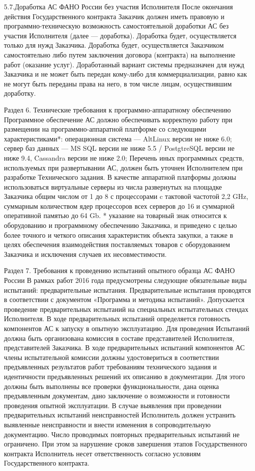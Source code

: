 5.7.Доработка АС  ФАНО России без участия Исполнителя
После окончания действия Государственного контракта Заказчик должен иметь правовую и программно-техническую возможность самостоятельной доработки АС  без участия Исполнителя (далее — доработка).
Доработка будет, осуществляется только для нужд Заказчика.
Доработка будет, осуществляется Заказчиком самостоятельно либо путем заключения договора (контракта) на выполнение работ (оказание услуг).
Доработанный вариант системы предназначен для нужд Заказчика и не может быть передан кому-либо для коммерциализации, равно как не могут быть переданы права на него, в том числе лицам, осуществившим доработку.

Раздел 6. Технические требования к программно-аппаратному обеспечению  
Программное обеспечение АС  должно обеспечивать корректную работу при размещении на программно-аппаратной платформе со следующими характеристиками*: 
операционная система — AltLinux версии не ниже 6.0; 
сервер баз данных — MS SQL версии не ниже 5.5 / PostgtreSQL версии не ниже 9.4, Cassandra версии не ниже 2.0;
Перечень иных программных средств, используемых при развертывании АС, должен быть уточнен Исполнителем при разработке Технического задания.
В качестве аппаратной платформы должны использоваться виртуальные серверы из числа развернутых на площадке Заказчика общим числом от 1 до 8 с процессорами c тактовой частотой 2,2 GHz, суммарным количеством ядер процессоров всех серверов до 16 и суммарной оперативной памятью до 64 Gb.
* указание на товарный знак относится к оборудованию и программному обеспечению Заказчика, и приведено с целью более точного и четкого описания характеристик объекта закупки, а также в целях обеспечения взаимодействия поставляемых товаров с оборудованием Заказчика и исключения случаев их несовместимости.

Раздел 7. Требования к проведению испытаний опытного образца АС  ФАНО России
В рамках работ 2016 года предусмотрены следующие обязательные виды испытаний: предварительные испытания.
Предварительные испытания проводятся в соответствии с документом «Программа и методика испытаний».
Допускается проведение предварительных испытаний на специальных испытательных стендах Исполнителя. В ходе предварительных испытаний определяется готовность компонентов АС к запуску в опытную эксплуатацию.
Для проведения Испытаний должна быть организована комиссия в составе представителей Исполнителя, представителей Заказчика.
В ходе предварительных испытаний  компонентов АС  члены испытательной комиссии должны удостовериться в соответствии предъявленных результатов работ требованиям технического задания и идентичности предъявленных решений их описанию в документации.
Для этого должны быть выполнены все проверки функциональности, дана оценка предъявленным документам, дано заключение о возможности и готовности проведения опытной эксплуатации.
В случае выявления при проведении предварительных испытаний неисправностей Исполнитель должен устранить выявленные неисправности и внести изменения в сопроводительную документацию.
Число проводимых повторных предварительных испытаний не ограничено. При этом за нарушение сроков завершения этапов Государственного контракта Исполнитель несет ответственность согласно условиям Государственного контракта.

